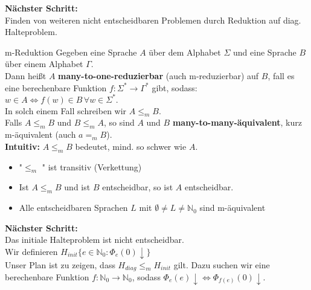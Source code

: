 \textbf{Nächster Schritt:} \\
Finden von weiteren nicht entscheidbaren Problemen durch Reduktion auf diag. Halteproblem.

\begin{defn}{m-Reduktion}
    Gegeben eine Sprache $A$ über dem Alphabet $\Sigma$ und eine Sprache $B$ über einem Alphabet $\Gamma$. \\
    Dann heißt $A$ \textbf{many-to-one-reduzierbar} (auch m-reduzierbar) auf $B$, fall es eine berechenbare Funktion
    $f : \Sigma^* \rightarrow \Gamma^*$ gibt, sodass: \\
    $w \in A \Leftrightarrow f(w) \in B \, \forall w \in \Sigma^*. $\\
    In solch einem Fall schreiben wir $A \leq_m B$. \\

    Falls $A \leq_m B$ und $B \leq_m A$, so sind $A$ und $B$ \textbf{many-to-many-äquivalent}, kurz m-äquivalent (auch $a =_m B$). \\

    \textbf{Intuitiv:} $A \leq_m B$ bedeutet, mind. so schwer wie $A$.
\end{defn}

\begin{bem}
    \begin{itemize}
        \item "$\leq_m$ "{} ist transitiv (Verkettung)
        \item Ist $A \leq_m B$ und ist $B$ entscheidbar, so ist $A$ entscheidbar.
        \item Alle entscheidbaren Sprachen $L$ mit $\emptyset \neq L \neq \mathbb{N}_0$ sind m-äquivalent
    \end{itemize}
\end{bem}

\textbf{Nächster Schritt:} \\
Das initiale Halteproblem ist nicht entscheidbar. \\

Wir definieren $H_{init}\{e \in \mathbb{N}_0 : \Phi_e(0)\downarrow\}$ \\

Unser Plan ist zu zeigen, dass $H_{diag} \leq_m H_{init}$ gilt.
Dazu suchen wir eine berechenbare Funktion $f: \mathbb{N}_0 \rightarrow \mathbb{N}_0$, sodass $\Phi_e(e)\downarrow \Leftrightarrow \Phi_{f(e)}(0)\downarrow$.

